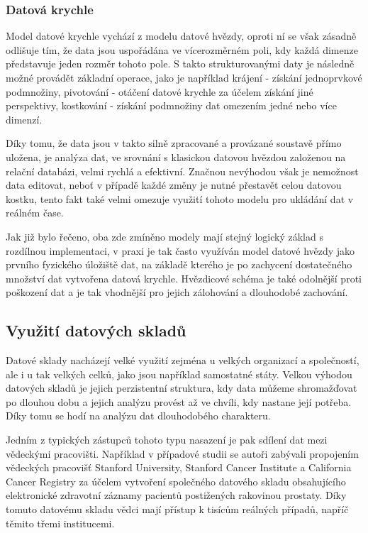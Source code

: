 \documentclass[
  digital,     %
  twoside,     %
  lof,         %
  lot,         %
]{fithesis4}
\begin{document}
\subsubsection{Datová krychle}
Model datové krychle vychází z modelu datové hvězdy, oproti ní se však zásadně odlišuje tím, že data jsou uspořádána ve vícerozměrném poli, kdy každá dimenze představuje jeden rozměr tohoto pole. S takto strukturovanými daty je následně možné provádět základní operace, jako je například krájení - získání jednoprvkové podmnožiny, pivotování - otáčení datové krychle za účelem získání jiné perspektivy, kostkování - získání podmnožiny dat omezením jedné nebo více dimenzí. 

Díky tomu, že data jsou v takto silně zpracované a provázané soustavě přímo uložena, je analýza dat, ve srovnání s klasickou datovou hvězdou založenou na relační databázi, velmi rychlá a efektivní.  Značnou nevýhodou však je nemožnost data editovat, neboť v případě každé změny je nutné přestavět celou datovou kostku, tento fakt také velmi omezuje využití tohoto modelu pro ukládání dat v reálném čase.

Jak již bylo řečeno, oba zde zmíněno modely mají stejný logický základ s rozdílnou implementaci, v praxi je tak často využíván model datové hvězdy jako prvního fyzického úložiště dat, na základě kterého je po zachycení dostatečného množství dat vytvořena datová krychle. Hvězdicové schéma je také odolnější proti poškození dat a je tak vhodnější pro jejich zálohování a dlouhodobé zachování.\parencite[s.9]{Kimball2013}

\subsection{Využití datových skladů}
Datové sklady nacházejí velké využití zejména u velkých organizací a společností, ale i u tak velkých celků, jako jsou například samostatné státy. Velkou výhodou datových skladů je jejich perzistentní struktura, kdy data můžeme shromažďovat po dlouhou dobu a jejich analýzu provést až ve chvíli, kdy nastane její potřeba. Díky tomu se hodí na analýzu dat dlouhodobého charakteru.

Jedním z typických zástupců tohoto typu nasazení je pak sdílení dat mezi vědeckými pracovišti. Například v případové studii  \parencite{Seneviratne20180124} se autoři zabývali propojením vědeckých pracovišť Stanford University, Stanford Cancer Institute a California Cancer Registry za účelem vytvoření společného datového skladu obsahujícího elektronické zdravotní záznamy pacientů postižených rakovinou prostaty. Díky tomuto datovému skladu vědci mají přístup k tisícům reálných případů, napříč těmito třemi institucemi.
\end{document}
